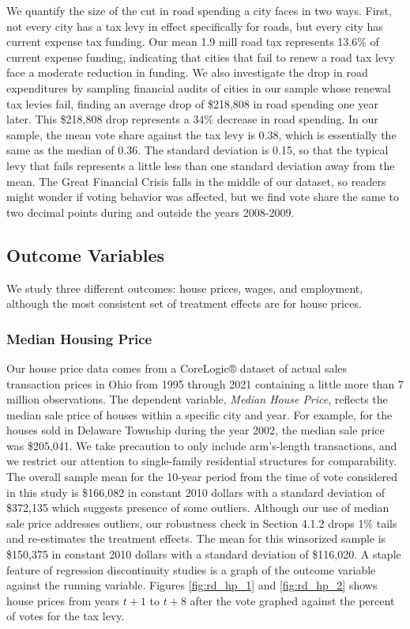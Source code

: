 We quantify the size of the cut in road spending a city faces in two ways.  First, not every city has a tax levy in effect specifically for roads, but every city has current expense tax funding.  Our mean 1.9 mill road tax represents 13.6\% of current expense funding, indicating that cities that fail to renew a road tax levy face a moderate reduction in funding.  We also investigate the drop in road expenditures by sampling financial audits of cities in our sample whose renewal tax levies fail, finding an average drop of \$218,808 in road spending one year later.  This \$218,808 drop represents a 34\% decrease in road spending.  
In our sample, the mean vote share against the tax levy is 0.38, which is essentially the same as the median of 0.36.  The standard deviation is 0.15, so that the typical levy that fails represents a little less than one standard deviation away from the mean. The Great Financial Crisis falls in the middle of our dataset, so readers might wonder if voting behavior was affected, but we find vote share the same to two decimal points during and outside the years 2008-2009. 


\subsection{Outcome Variables}

We study three different outcomes:  house prices, wages, and employment, although the most consistent set of treatment effects are for house prices.  

\subsubsection{Median Housing Price}

Our house price data comes from a CoreLogic® dataset of actual sales transaction prices in Ohio from 1995 through 2021 containing a little more than 7 million observations. The dependent variable, \textit{Median House Price}, reflects the median sale price of houses within a specific city and year. For example, for the houses sold in Delaware Township during the year 2002, the median sale price was \$205,041. We take precaution to only include arm’s-length transactions, and we restrict our attention to single-family residential structures for comparability.  The overall sample mean for the 10-year period from the time of vote considered in this study is \$166,082 in constant 2010 dollars with a standard deviation of \$372,135 which suggests presence of some outliers. Although our use of median sale price addresses outliers, our robustness check in Section 4.1.2 drops 1\% tails and re-estimates the treatment effects.  The mean for this winsorized sample is \$150,375 in constant 2010 dollars with a standard deviation of \$116,020. A staple feature of regression discontinuity studies is a graph of the outcome variable against the running variable. Figures \ref{fig:rd_hp_1} and \ref{fig:rd_hp_2} shows house prices from years $t+1$ to $t+8$ after the vote graphed against the percent of votes for the tax levy.

